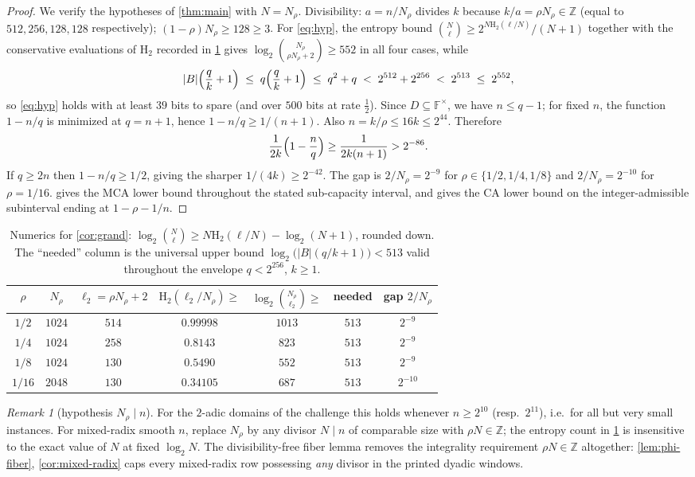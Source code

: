 \documentclass[11pt]{article}
\theoremstyle{definition}
\theoremstyle{remark}
\newtheorem{remark}[remark]{Remark}
\newcommand{\F}{\mathbb{F}}
\newcommand{\B}{B}
\newcommand{\Hb}{\mathrm{H}_2}
\begin{document}
\begin{proof}
We verify the hypotheses of \cref{thm:main} with $N=N_\rho$. Divisibility: $a=n/N_\rho$ divides $k$ because $k/a=\rho N_\rho\in\mathbb Z$ (equal to $512,256,128,128$ respectively); $(1-\rho)N_\rho\ge128\ge3$. For \eqref{eq:hyp}, the entropy bound $\binom N\ell\ge2^{N\Hb(\ell/N)}/(N+1)$ together with the conservative evaluations of $\Hb$ recorded in \cref{tab:numerics} gives $\log_2\binom{N_\rho}{\rho N_\rho+2}\ge552$ in all four cases, while
\[
|\B|\Bigl(\frac qk+1\Bigr)\;\le\;q\Bigl(\frac qk+1\Bigr)\;\le\;q^2+q\;<\;2^{512}+2^{256}\;<\;2^{513}\;\le\;2^{552},
\]
so \eqref{eq:hyp} holds with at least $39$ bits to spare (and over $500$ bits at rate $\frac12$). Since $D\subseteq\F^\times$, we have $n\le q-1$; for fixed $n$, the function $1-n/q$ is minimized at $q=n+1$, hence $1-n/q\ge1/(n+1)$. Also $n=k/\rho\le16k\le2^{44}$. Therefore
\[
\frac1{2k}\Bigl(1-\frac nq\Bigr)\ge\frac1{2k(n+1)}>2^{-86}.
\]
If $q\ge2n$ then $1-n/q\ge1/2$, giving the sharper $1/(4k)\ge2^{-42}$. The gap is $2/N_\rho=2^{-9}$ for $\rho\in\{1/2,1/4,1/8\}$ and $2/N_\rho=2^{-10}$ for $\rho=1/16$.  gives the MCA lower bound throughout the stated sub-capacity interval, and gives the CA lower bound on the integer-admissible subinterval ending at $1-\rho-1/n$.
\end{proof}

\begin{table}[ht]
\centering
\begin{tabular}{ccccccc}
\toprule
$\rho$ & $N_\rho$ & $\ell_2=\rho N_\rho+2$ & $\Hb(\ell_2/N_\rho)\ge$ & $\log_2\binom{N_\rho}{\ell_2}\ge$ & needed & gap $2/N_\rho$\\
\midrule
$1/2$  & $1024$ & $514$ & $0.99998$ & $1013$ & $513$ & $2^{-9}$\\
$1/4$  & $1024$ & $258$ & $0.8143$  & $823$  & $513$ & $2^{-9}$\\
$1/8$  & $1024$ & $130$ & $0.5490$  & $552$  & $513$ & $2^{-9}$\\
$1/16$ & $2048$ & $130$ & $0.34105$ & $687$  & $513$ & $2^{-10}$\\
\bottomrule
\end{tabular}
\caption{Numerics for \cref{cor:grand}: $\log_2\binom{N}{\ell}\ge N\Hb(\ell/N)-\log_2(N+1)$, rounded down. The ``needed'' column is the universal upper bound $\log_2\bigl(|\B|(q/k+1)\bigr)<513$ valid throughout the envelope $q<2^{256}$, $k\ge1$.}
\label{tab:numerics}
\end{table}

\begin{remark}[hypothesis $N_\rho\mid n$]
For the $2$-adic domains of the challenge this holds whenever $n\ge2^{10}$ (resp.\ $2^{11}$), i.e.\ for all but very small instances. For mixed-radix smooth $n$, replace $N_\rho$ by any divisor $N\mid n$ of comparable size with $\rho N\in\mathbb Z$; the entropy count in \cref{tab:numerics} is insensitive to the exact value of $N$ at fixed $\log_2 N$. The divisibility-free fiber lemma removes the integrality requirement $\rho N\in\mathbb Z$ altogether: \cref{lem:phi-fiber}, \cref{cor:mixed-radix} caps every mixed-radix row possessing \emph{any} divisor in the printed dyadic windows.
\end{remark}
\end{document}
